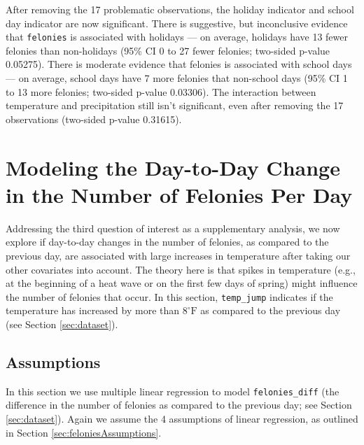 \documentclass[11pt,notitlepage]{article}
\newcommand{\degf}{^\circ\text{F}}
\begin{document}


After removing the 17 problematic observations, the holiday indicator and school day indicator are now significant. There is suggestive, but inconclusive evidence that \texttt{felonies} is associated with holidays --- on average, holidays have 13 fewer felonies than non-holidays (95\% CI 0 to 27 fewer felonies; two-sided p-value 0.05275). There is moderate evidence that felonies is associated with school days --- on average, school days have 7 more felonies that non-school days (95\% CI 1 to 13 more felonies; two-sided p-value 0.03306). The interaction between temperature and precipitation still isn't significant, even after removing the 17 observations (two-sided p-value 0.31615).






\section{Modeling the Day-to-Day Change in the Number of Felonies Per Day}
\label{sec:modelingFeloniesDiff}


Addressing the third question of interest as a supplementary analysis, we now explore if day-to-day changes in the number of felonies, as compared to the previous day, are associated with large increases in temperature after taking our other covariates into account. The theory here is that spikes in temperature (e.g., at the beginning of a heat wave or on the first few days of spring) might influence the number of felonies that occur. In this section, \texttt{temp_jump} indicates if the temperature has increased by more than $8\degf$ as compared to the previous day (see Section \ref{sec:dataset}).




\subsection{Assumptions}
\label{sec:feloniesDiffAssumptions}


In this section we use multiple linear regression to model \texttt{felonies_diff} (the difference in the number of felonies as compared to the previous day; see Section \ref{sec:dataset}). Again we assume the 4 assumptions of linear regression, as outlined in Section \ref{sec:feloniesAssumptions}.
\end{document}
